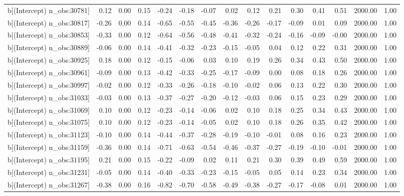 \begin{table}[ht]
\begin{tabular}{rrrrrrrrrrrrrrr}
  b[(Intercept) n\_obs:30781] & 0.12 & 0.00 & 0.15 & -0.24 & -0.18 & -0.07 & 0.02 & 0.12 & 0.21 & 0.30 & 0.41 & 0.51 & 2000.00 & 1.00 \\ 
  b[(Intercept) n\_obs:30817] & -0.26 & 0.00 & 0.14 & -0.65 & -0.55 & -0.45 & -0.36 & -0.26 & -0.17 & -0.09 & 0.01 & 0.09 & 2000.00 & 1.00 \\ 
  b[(Intercept) n\_obs:30853] & -0.33 & 0.00 & 0.12 & -0.64 & -0.56 & -0.48 & -0.41 & -0.32 & -0.24 & -0.16 & -0.09 & -0.00 & 2000.00 & 1.00 \\ 
  b[(Intercept) n\_obs:30889] & -0.06 & 0.00 & 0.14 & -0.41 & -0.32 & -0.23 & -0.15 & -0.05 & 0.04 & 0.12 & 0.22 & 0.31 & 2000.00 & 1.00 \\ 
  b[(Intercept) n\_obs:30925] & 0.18 & 0.00 & 0.12 & -0.15 & -0.06 & 0.03 & 0.10 & 0.19 & 0.26 & 0.34 & 0.43 & 0.50 & 2000.00 & 1.00 \\ 
  b[(Intercept) n\_obs:30961] & -0.09 & 0.00 & 0.13 & -0.42 & -0.33 & -0.25 & -0.17 & -0.09 & 0.00 & 0.08 & 0.18 & 0.26 & 2000.00 & 1.00 \\ 
  b[(Intercept) n\_obs:30997] & -0.02 & 0.00 & 0.12 & -0.33 & -0.26 & -0.18 & -0.10 & -0.02 & 0.06 & 0.13 & 0.22 & 0.30 & 2000.00 & 1.00 \\ 
  b[(Intercept) n\_obs:31033] & -0.03 & 0.00 & 0.13 & -0.37 & -0.27 & -0.20 & -0.12 & -0.03 & 0.06 & 0.15 & 0.23 & 0.29 & 2000.00 & 1.00 \\ 
  b[(Intercept) n\_obs:31069] & 0.10 & 0.00 & 0.12 & -0.23 & -0.14 & -0.06 & 0.02 & 0.10 & 0.18 & 0.25 & 0.34 & 0.43 & 2000.00 & 1.00 \\ 
  b[(Intercept) n\_obs:31075] & 0.10 & 0.00 & 0.12 & -0.23 & -0.14 & -0.05 & 0.02 & 0.10 & 0.18 & 0.26 & 0.35 & 0.42 & 2000.00 & 1.00 \\ 
  b[(Intercept) n\_obs:31123] & -0.10 & 0.00 & 0.14 & -0.44 & -0.37 & -0.28 & -0.19 & -0.10 & -0.01 & 0.08 & 0.16 & 0.23 & 2000.00 & 1.00 \\ 
  b[(Intercept) n\_obs:31159] & -0.36 & 0.00 & 0.14 & -0.71 & -0.63 & -0.54 & -0.46 & -0.37 & -0.27 & -0.19 & -0.10 & -0.01 & 2000.00 & 1.00 \\ 
  b[(Intercept) n\_obs:31195] & 0.21 & 0.00 & 0.15 & -0.22 & -0.09 & 0.02 & 0.11 & 0.21 & 0.30 & 0.39 & 0.49 & 0.59 & 2000.00 & 1.00 \\ 
  b[(Intercept) n\_obs:31231] & -0.05 & 0.00 & 0.14 & -0.40 & -0.33 & -0.23 & -0.15 & -0.05 & 0.05 & 0.14 & 0.23 & 0.34 & 2000.00 & 1.00 \\ 
  b[(Intercept) n\_obs:31267] & -0.38 & 0.00 & 0.16 & -0.82 & -0.70 & -0.58 & -0.49 & -0.38 & -0.27 & -0.17 & -0.08 & 0.01 & 2000.00 & 1.00 \\ 

\end{tabular}
\end{table}
